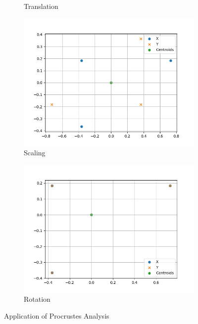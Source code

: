 \documentclass[12pt]{report}
\begin{document}
\begin{figure}[h]
\begin{subfigure}[b]{0.475\textwidth}
        \caption[]
        {{\small Translation}}    
        \label{fig:procrustes_ex_2}
    \end{subfigure}
    \begin{subfigure}[b]{0.475\textwidth}   
        \centering 
        \includegraphics[width=\textwidth]{figures/procrustes_ex3}
        \caption[]
        {{\small Scaling}}    
        \label{fig:procrustes_ex_3}
    \end{subfigure}
    \begin{subfigure}[b]{0.475\textwidth}   
        \centering 
        \includegraphics[width=\textwidth]{figures/procrustes_ex4}
        \caption[]
        {{\small Rotation}}    
        \label{fig:procrustes_ex_4}
    \end{subfigure}
    \caption[]
    {Application of Procrustes Analysis} 
    \label{fig:procrustes_analysis}
\end{figure}
\end{document}
